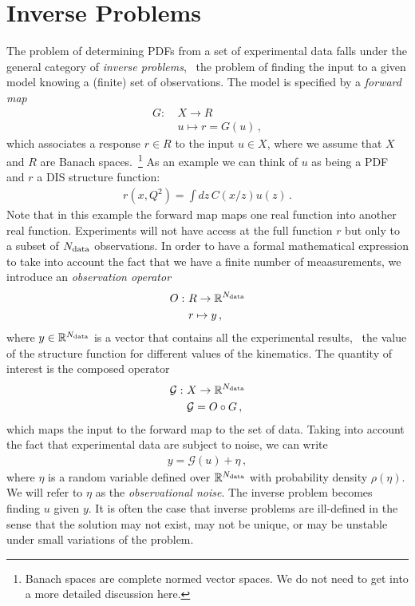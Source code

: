 
\section{Inverse Problems}
\label{sec:inverse-problems}

The problem of determining PDFs from a set of experimental data falls
under the general category of {\em inverse problems}, \ie\ the problem
of finding the input to a given model knowing a (finite) set of
observations. The model is specified by a {\em forward map}
\begin{align}
  \label{eq:ForwardMap}
  G : ~& X \to R \nonumber \\
      & u \mapsto r=G(u) \, ,
\end{align}
which associates a response $r \in R$ to the input $u \in X$, where we
assume that $X$ and $R$ are Banach spaces.~\footnote{Banach spaces are
  complete normed vector spaces. We do not need to get into a more
  detailed discussion here.} As an example we can think of $u$ as
being a PDF and $r$ a DIS structure function:
\begin{align}
  \label{eq:DISExample}
  r(x,Q^2) = \int dz\, C(x/z) u(z)\, .
\end{align}
Note that in this example the forward map maps one real function into
another real function. Experiments will not have access at the full
function $r$ but only to a subset of $N_{\rm data}$ observations. In order
to have a formal mathematical expression to take into account the fact
that we have a finite number of meaasurements, we introduce an {\em
  observation operator}
\begin{align}
  O : ~& R \to \mathbb{R}^{N_{\rm data}} \nonumber \\
       & r \mapsto y \, ,
\end{align}
where $y \in \mathbb{R}^{N_{\rm data}}$ is a vector that contains all the
experimental results, \eg\ the value of the structure function for
different values of the kinematics. The quantity of interest is the
composed operator
\begin{align}
  \mathcal{G} : ~& X \to \mathbb{R}^{N_{\rm data}} \nonumber \\
                 & \mathcal{G} = O \circ G\, ,
\end{align}
which maps the input to the forward map to the set of data. Taking
into account the fact that experimental data are subject to noise, we
can write
\begin{align}
  \label{eq:NoisyInverseProblem}
  y = \mathcal{G}(u) + \eta\, ,
\end{align}
where $\eta$ is a random variable defined over $\mathbb{R}^{N_{\rm data}}$
with probability density $\rho(\eta)$. We will refer to $\eta$ as the
{\em observational noise}. The inverse problem becomes finding $u$
given $y$. It is often the case that inverse problems are ill-defined
in the sense that the solution may not exist, may not be unique, or
may be unstable under small variations of the problem. 

